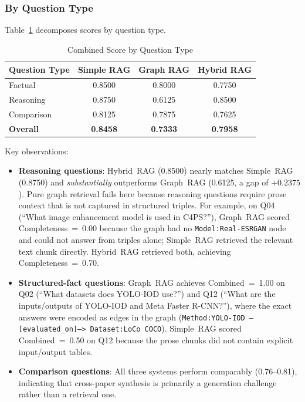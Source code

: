 \documentclass[conference]{IEEEtran}
\begin{document}
\subsubsection{By Question Type}

Table~\ref{tab:results_breakdown} decomposes scores by question type.

\begin{table}[htbp]
  \caption{Combined Score by Question Type}
  \label{tab:results_breakdown}
  \centering
  \begin{tabular}{lccc}
    \toprule
    \textbf{Question Type} & \textbf{Simple RAG} & \textbf{Graph RAG}
      & \textbf{Hybrid RAG} \\
    \midrule
    Factual     & 0.8500 & 0.8000 & 0.7750 \\
    Reasoning   & 0.8750 & 0.6125 & 0.8500 \\
    Comparison  & 0.8125 & 0.7875 & 0.7625 \\
    \midrule
    \textbf{Overall} & \textbf{0.8458} & \textbf{0.7333} & \textbf{0.7958} \\
    \bottomrule
  \end{tabular}
\end{table}

Key observations:

\begin{itemize}
  \item \textbf{Reasoning questions}: Hybrid~RAG (0.8500) nearly matches
  Simple~RAG (0.8750) and \emph{substantially} outperforms Graph~RAG
  (0.6125, a gap of $+0.2375$). Pure graph retrieval fails here because
  reasoning questions require prose context that is not captured in
  structured triples. For example, on Q04 (``What image enhancement model
  is used in C4PS?''), Graph~RAG scored Completeness~=~0.00 because the
  graph had no \texttt{Model:Real-ESRGAN} node and could not answer from
  triples alone; Simple~RAG retrieved the relevant text chunk directly.
  Hybrid~RAG retrieved both, achieving Completeness~=~0.70.

  \item \textbf{Structured-fact questions}: Graph~RAG achieves
  Combined~=~1.00 on Q02 (``What datasets does YOLO-IOD use?'') and Q12
  (``What are the inputs/outputs of YOLO-IOD and Meta Faster R-CNN?''),
  where the exact answers were encoded as edges in the graph
  (\texttt{Method:YOLO-IOD --[evaluated\_on]--> Dataset:LoCo COCO}).
  Simple~RAG scored Combined~=~0.50 on Q12 because the prose chunks did
  not contain explicit input/output tables.

  \item \textbf{Comparison questions}: All three systems perform
  comparably (0.76--0.81), indicating that cross-paper synthesis is
  primarily a generation challenge rather than a retrieval one.
\end{itemize}
\end{document}
